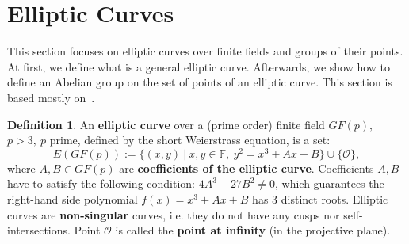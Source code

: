 \documentclass[thesis=M,english]{FITthesis}[2012/10/20]
\theoremstyle{remark}
\theoremstyle{definition}
\newtheorem{DF}{Definition}[section]
\begin{document}
\section{Elliptic Curves}
This section focuses on elliptic curves over finite fields and groups of their points. At first, we define what is a general elliptic curve. Afterwards, we show how to define an Abelian group on the set of points of an elliptic curve. This section is based mostly on~\cite{mky}.
\begin{DF}
An \textbf{elliptic curve} over a (prime order) finite field $GF(p),$ \\ $p > 3,\ p$ prime, defined by the short Weierstrass equation, is a set:
$$
E(GF(p)) := \{(x,y)\ |\ x,y \in \mathbb{F},\ y^2 = x^3 + Ax+B\} \cup \{ \mathcal{O} \},
$$
where $A, B \in GF(p)$ are \textbf{coefficients of the elliptic curve}. Coefficients $A,B$ have to satisfy the following condition: $4A^3 + 27B^2 \neq 0$, which guarantees the right-hand side polynomial $f(x)=x^3 + Ax+B$ has 3 distinct roots. Elliptic curves are \textbf{non-singular} curves, i.e. they do not have any cusps nor self-intersections. Point $\mathcal{O}$ is called the \textbf{point at infinity} (in the projective plane).
\end{DF}
\end{document}
